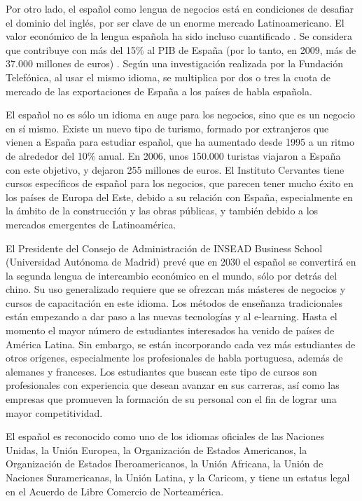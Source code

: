 \begin{multicols}{2}
Por otro lado, el español como lengua de negocios está en condiciones de desafiar el dominio del inglés, por ser clave de un enorme mercado Latinoamericano. El valor económico de la lengua española ha sido incluso cuantificado \cite{ecospanish1}. Se considera que contribuye con más del 15\% al PIB de España (por lo tanto, en 2009, más de 37.000 millones de euros) \cite{ecospanish2}. Según una investigación realizada por la Fundación Telefónica, al usar el mismo idioma, se multiplica por dos o tres la cuota de mercado de las exportaciones de España a los países de habla española.

El español no es sólo un idioma en auge para los negocios, sino que es un negocio en sí mismo. Existe un nuevo tipo de turismo, formado por extranjeros que vienen a España para estudiar español, que ha aumentado desde 1995 a un ritmo de alrededor del 10\% anual. En 2006, unos 150.000 turistas viajaron a España con este objetivo, y dejaron 255 millones de euros. El Instituto Cervantes tiene cursos específicos de español para los negocios, que parecen tener mucho éxito en los países de Europa del Este, debido a su relación con España, especialmente en la ámbito de la construcción y las obras públicas, y también debido a los mercados emergentes de Latinoamérica.

El Presidente del Consejo de Administración de INSEAD Business School (Universidad Autónoma de Madrid) prevé que en 2030 el español se convertirá en la segunda lengua de intercambio económico en el mundo, sólo por detrás del chino. Su uso generalizado requiere que se ofrezcan más másteres de negocios y cursos de capacitación en este idioma. Los métodos de enseñanza tradicionales están empezando a dar paso a las nuevas tecnologías y al e-learning. Hasta el momento el mayor número de estudiantes interesados ha venido de países de América Latina. Sin embargo, se están incorporando cada vez más estudiantes de otros orígenes, especialmente los profesionales de habla portuguesa, además de alemanes y franceses. Los estudiantes que buscan este tipo de cursos son profesionales con experiencia que desean avanzar en sus carreras, así como las empresas que promueven la formación de su personal con el fin de lograr una mayor competitividad.

El español es reconocido como uno de los idiomas oficiales de las Naciones Unidas, la Unión Europea, la Organización de Estados Americanos, la Organización de Estados Iberoamericanos, la Unión Africana, la Unión de Naciones Suramericanas, la Unión Latina, y la Caricom, y tiene un estatus legal en el Acuerdo de Libre Comercio de Norteamérica.


\end{multicols}
